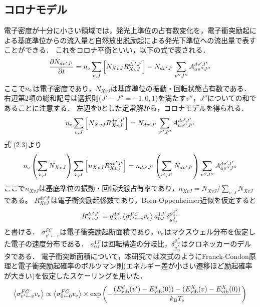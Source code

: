 \subsection{コロナモデル}
電子密度が十分に小さい領域では，発光上準位の占有数変化を，電子衝突励起による基底準位からの流入量と自然放出脱励起による発光下準位への流出量で表すことができる．
これをコロナ平衡といい，以下の式で表される\cite{PRnoijousei}．
\begin{equation}
    \frac{\partial N_{dv'J'}}{\partial t} = n_{\rm e} \sum_{v, J} \left[ N_{XvJ} R^{dv'J'}_{XvJ} \right] - N_{dv'J'} \sum_{v''J''} A^{dv'J'}_{av''J''}
\end{equation}
ここで$n_{\rm e}$は電子密度であり，$N_{XvJ}$は基底準位の振動・回転状態占有数である．
右辺第2項の総和記号は選択則($J'-J''=-1,0,1$)を満たす$v''，J''$についての和であることに注意する．
左辺を0とした定常解から，コロナモデルを得られる．
\begin{equation}
    n_{\rm e} \sum_{v, J} \left[ N_{XvJ} R^{dv'J'}_{XvJ} \right] = N_{dv'J'} \sum_{v''J''} A^{dv'J'}_{av''J''}
\end{equation}
式 (2.3)より
\begin{equation}
    n_{\rm e} \left( \sum_{v, J} N_{XvJ} \right) \sum_{v, J} \left[ n_{XvJ} R^{dv'J'}_{XvJ} \right] = n_{dv'J'} \left( \sum_{v', J'} N_{dv'J'} \right) \sum_{v''J''} A^{dv'J'}_{av''J''}
\end{equation}
ここで$n_{XvJ}$は基底準位の振動・回転状態占有率であり，$n_{XvJ} = N_{XvJ} / \sum_{v,J} N_{XvJ}$である。
$R^{dv'J'}_{XvJ}$は電子衝突励起係数であり，Born-Oppenheimer近似を仮定すると
\begin{equation}
    R^{dv'J'}_{XvJ} = q^{dv'}_{Xv} \left< \sigma^{FC}_{v' \leftarrow v} v_{\rm e} \right> a^{1J'}_{0J} \delta^{g^{J'}_{as}}_{g^J_{as}}
\end{equation}
と書ける\cite{PRnoijousei}．
$\sigma^{FC}_{v' \leftarrow v}$は電子衝突励起断面積であり，$v_{\rm e}$はマクスウェル分布を仮定した電子の速度分布である．
$a^{1J'}_{0J}$は回転構造の分岐比，$\delta^{g^{J'}_{as}}_{g^J_{as}}$はクロネッカーのデルタである．
電子衝突断面積について，本研究では次式のようにFranck-Condon原理と電子衝突励起確率のボルツマン則(エネルギー差が小さい遷移ほど励起確率が大きい)を仮定したスケーリングを用いた\cite{kyokaisou}．
\begin{equation}
    \left< \sigma^{FC}_{v' \leftarrow v} v_{\rm e} \right> \propto \left< \sigma^{FC}_{0 \leftarrow 0} v_{\rm e} \right> \times \exp \left( -\frac{(E^d_{\rm vib} (v') - E^d_{\rm vib} (0))-(E^X_{\rm vib} (v) - E^X_{\rm vib} (0))}{k_{\rm B} T_{\rm e}} \right)
\end{equation}
